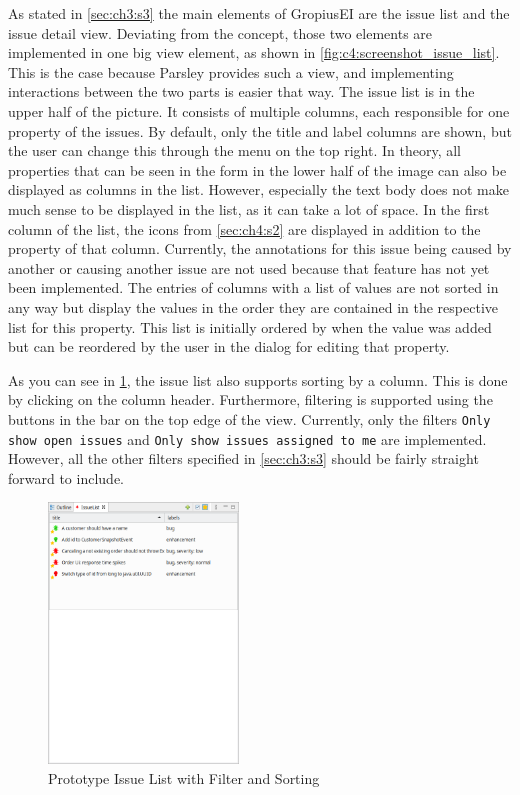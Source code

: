 As stated in \cref{sec:ch3:s3} the main elements of \gls{GropiusEI} are the issue list and the issue detail view.
Deviating from the concept, those two elements are implemented in one big view element, as shown in \cref{fig:c4:screenshot_issue_list}.
This is the case because \gls{Parsley} provides such a view, and implementing interactions between the two parts is easier that way.
The issue list is in the upper half of the picture. 
It consists of multiple columns, each responsible for one property of the issues.
By default, only the title and label columns are shown, but the user can change this through the menu on the top right.
In theory, all properties that can be seen in the form in the lower half of the image can also be displayed as columns in the list.
However, especially the text body does not make much sense to be displayed in the list, as it can take a lot of space.
In the first column of the list, the icons from \ref{sec:ch4:s2} are displayed in addition to the property of that column.
Currently, the annotations for this issue being caused by another or causing another issue are not used because that feature has not yet been implemented.
The entries of columns with a list of values are not sorted in any way but display the values in the order they are contained in the respective list for this property.
This list is initially ordered by when the value was added but can be reordered by the user in the dialog for editing that property.

As you can see in \cref{fig:c4:screenshot_issue_list_filtered_sorted}, the issue list also supports sorting by a column.
This is done by clicking on the column header.
Furthermore, filtering is supported using the buttons in the bar on the top edge of the view.
Currently, only the filters \lstinline|Only show open issues| and \lstinline|Only show issues assigned to me| are implemented. 
However, all the other filters specified in \cref{sec:ch3:s3} should be fairly straight forward to include.

\begin{figure}[!h]
	\centering
	\includegraphics[width=0.45\textwidth]{graphics/screenshot_gropius_ei_issue_list_filtered_sorted.png}
	\caption{Prototype Issue List with Filter and Sorting}
	\label{fig:c4:screenshot_issue_list_filtered_sorted}
\end{figure}

